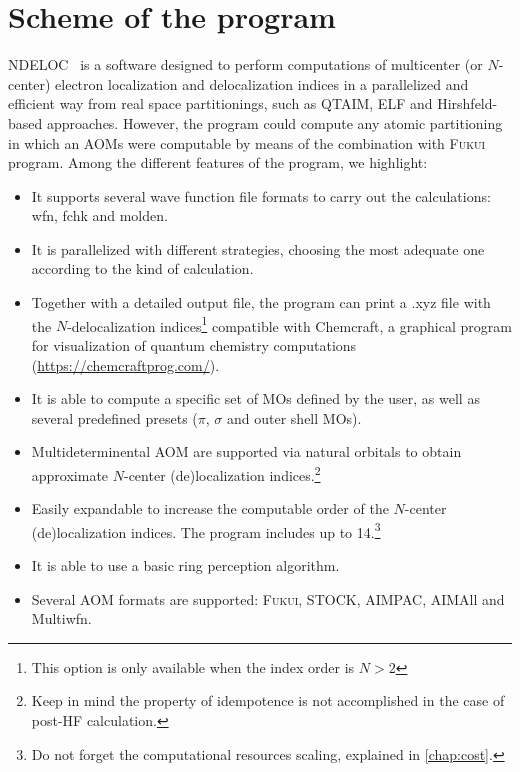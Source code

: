 \documentclass[a4paper,11pt,openany]{memoir}
\newcommand\programa{\textsc{NDELOC}}
\begin{document}
\section{Scheme of the program}
\programa~ is a software designed to perform computations of multicenter (or $N$-center) electron localization and delocalization indices in a parallelized and efficient way from real space partitionings, such as \ac{QTAIM}\autocite{bader1994atoms}, \ac{ELF}\autocite{simplemeasureelectronBE1990,ElectronLocalizationSolidSJF1992} and Hirshfeld-based\autocite{BondedatomfragmentsHirshfeld1977,CriticalanalysisextensionBAA2007,ExtensionHirshfeldMethodGKB2011} approaches. However, the program could compute any atomic partitioning in which an \acp{AOM} were computable by means of the combination with \textsc{Fukui} program. Among the different features of the program, we highlight:
\begin{itemize}
	\item It supports several wave function file formats to carry out the calculations: wfn, fchk and molden.
	\item It is parallelized with different strategies, choosing the most adequate one according to the kind of calculation.
	\item Together with a detailed output file, the program can print a .xyz file with the $N$-delocalization indices\footnote{This option is only available when the index order is $N>2$} compatible with Chemcraft, a graphical program for visualization of quantum chemistry computations (\url{https://chemcraftprog.com/}).
	\item It is able to compute a specific set of \acfp{MO} defined by the user, as well as several predefined presets ($\pi$, $\sigma$ and outer shell \acp{MO}).
	\item Multideterminental \ac{AOM} are supported via natural orbitals to obtain approximate $N$-center (de)localization indices.\footnote{Keep in mind the property of idempotence is not accomplished in the case of post-HF calculation.}
	\item Easily expandable to increase the computable order of the $N$-center (de)localization indices. The program includes up to \num{14}.\footnote{Do not forget the computational resources scaling, explained in \autoref{chap:cost}.}
	\item It is able to use a basic ring perception algorithm.
	\item Several \ac{AOM} formats are supported: \textsc{Fukui}, STOCK, AIMPAC, AIMAll and Multiwfn.
\end{itemize}
\end{document}
